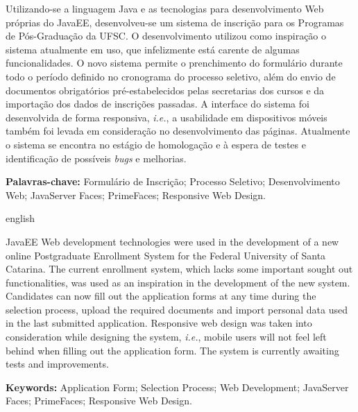 \documentclass[
  10.5pt,				  %
	openright,			%
	twoside,			  %
  a5paper,
  chapter=TITLE,	%
	section=TITLE,	%
  hyphens,        %
	english,        %
	brazil          %
]{abntex2}
\begin{document}
 
\begin{resumo}

Utilizando-se a linguagem Java e as tecnologias para desenvolvimento Web próprias do JavaEE, desenvolveu-se um sistema de inscrição para os Programas de Pós-Graduação da UFSC. O desenvolvimento utilizou como inspiração o sistema atualmente em uso, que infelizmente está carente de algumas funcionalidades. O novo sistema permite o prenchimento do formulário durante todo o período definido no cronograma do processo seletivo, além do envio de documentos obrigatórios pré-estabelecidos pelas secretarias dos cursos e da importação dos dados de inscrições passadas. A interface do sistema foi desenvolvida de forma responsiva, \emph{i.e.}, a usabilidade em dispositivos móveis também foi levada em consideração no desenvolvimento das páginas. Atualmente o sistema se encontra no estágio de homologação e à espera de testes e identificação de possíveis \emph{bugs} e melhorias.

\vspace{\onelineskip}
\noindent \textbf{Palavras-chave:} Formulário de Inscrição; Processo Seletivo; Desenvolvimento Web; JavaServer Faces; PrimeFaces; Responsive Web Design.
\end{resumo}
\begin{resumo}[Abstract]
\begin{otherlanguage*}{english}

JavaEE Web development technologies were used in the development of a new online Postgraduate Enrollment System for the Federal University of Santa Catarina. The current enrollment system, which lacks some important sought out functionalities, was used as an inspiration in the development of the new system. Candidates can now fill out the application forms at any time during the selection process, upload the required documents and import personal data used in the last submitted application. Responsive web design was taken into consideration while designing the system, \emph{i.e.}, mobile users will not feel left behind when filling out the application form. The system is currently awaiting tests and improvements.

\vspace{\onelineskip}
\noindent \textbf{Keywords:} Application Form; Selection Process; Web Development; JavaServer Faces; PrimeFaces; Responsive Web Design.
\end{otherlanguage*}
\end{resumo}
\end{document}
